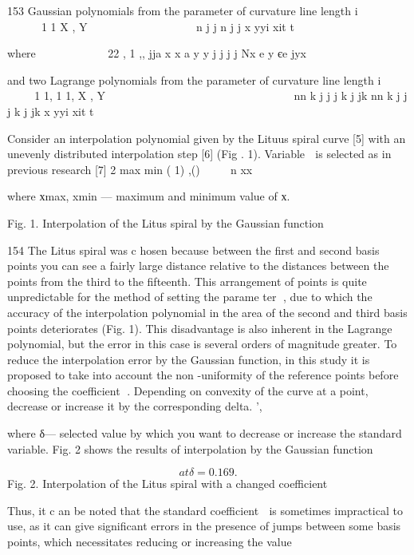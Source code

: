 \documentclass[12pt,a4paper]{article}
\begin{document}
\par
153 Gaussian polynomials from the parameter of curvature line length i             1 1 X , Y               n j j n j j x yyi xit t
\par
where           22 , 1 ,, jja x x a y y j j j j Nx e y єe jyx     
\par
and two Lagrange polynomials from the parameter of curvature line length i         1 1, 1 1, X , Y                       nn k j j j k j jk nn k j j j k j jk x yyi xit t
\par
Consider an interpolation polynomial given by the Lituus spiral curve [5] with an unevenly distributed interpolation step [6] (Fig . 1). Variable  is selected as in previous research [7] 2 max min ( 1) ,()    n xx
\par
where хmax, xmin — maximum and minimum value of х.
\par
Fig. 1. Interpolation of the Litus spiral by the Gaussian function
\par
154 The Litus spiral was c hosen because between the first and second basis points you can see a fairly large distance relative to the distances between the points from the third to the fifteenth. This arrangement of points is quite unpredictable for the method of setting the parame ter , due to which the accuracy of the interpolation polynomial in the area of the second and third basis points deteriorates (Fig. 1). This disadvantage is also inherent in the Lagrange polynomial, but the error in this case is several orders of magnitude greater. To reduce the interpolation error by the Gaussian function, in this study it is proposed to take into account the non -uniformity of the reference points before choosing the coefficient . Depending on convexity of the curve at a point, decrease or increase it by the corresponding delta. ',  
\par
where δ— selected value by which you want to decrease or increase the standard variable. Fig. 2 shows the results of interpolation by the Gaussian function
\par
\[at \delta = 0.169.\]
Fig. 2. Interpolation of the Litus spiral with a changed coefficient 
\par
Thus, it c an be noted that the standard coefficient  is sometimes impractical to use, as it can give significant errors in the presence of jumps between some basis points, which necessitates reducing or increasing the value
\par
\end{document}
